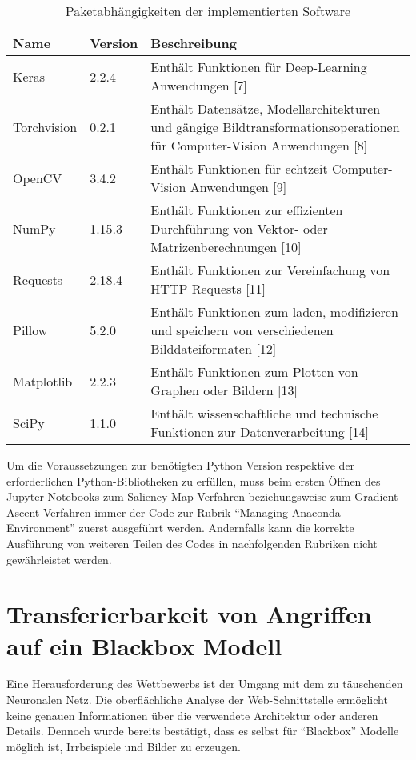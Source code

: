 \begin{table}
	\centering
	\begin{tabular}{|l|l|p{10.4cm}|}
		\hline 
		Name & Version & Beschreibung \\ 
		\hline\hline 
		Keras& 2.2.4  & Enthält Funktionen für Deep-Learning Anwendungen [7] \\ 
		\hline 
		Torchvision& 0.2.1 & Enthält Datensätze, Modellarchitekturen und gängige Bildtransformationsoperationen für Computer-Vision Anwendungen [8] \\ 
		\hline 
		OpenCV& 3.4.2  & Enthält Funktionen für echtzeit Computer-Vision Anwendungen [9] \\ 
		\hline 
		NumPy&  1.15.3& Enthält Funktionen zur effizienten Durchführung von Vektor- oder Matrizenberechnungen [10] \\ 
		\hline 
		Requests& 2.18.4 & Enthält Funktionen zur Vereinfachung von HTTP Requests [11] \\ 
		\hline 
		Pillow& 5.2.0 & Enthält Funktionen zum laden, modifizieren und speichern von verschiedenen Bilddateiformaten [12] \\ 
		\hline 
		Matplotlib& 2.2.3 & Enthält Funktionen zum Plotten von Graphen oder Bildern [13] \\ 
		\hline 
		SciPy& 1.1.0  & Enthält wissenschaftliche und technische Funktionen zur Datenverarbeitung [14] \\ 
		\hline 
	\end{tabular} 
	\caption{Paketabhängigkeiten der implementierten Software}
	\label{tab:parameter}
\end{table}

Um die Voraussetzungen zur benötigten Python Version respektive der erforderlichen Python-Bibliotheken zu erfüllen, muss beim ersten Öffnen des Jupyter Notebooks zum Saliency Map Verfahren beziehungsweise zum Gradient Ascent Verfahren immer der Code zur Rubrik “Managing Anaconda Environment” zuerst ausgeführt werden. Andernfalls kann die korrekte Ausführung von weiteren Teilen des Codes in nachfolgenden Rubriken nicht gewährleistet werden.

\section{Transferierbarkeit von Angriffen auf ein Blackbox Modell}


\label{sec:TrasiModell}
Eine Herausforderung des Wettbewerbs ist der Umgang mit dem zu täuschenden Neuronalen Netz. Die oberflächliche Analyse der Web-Schnittstelle ermöglicht keine genauen Informationen über die verwendete Architektur oder anderen Details. Dennoch wurde bereits bestätigt, dass es selbst für “Blackbox” Modelle möglich ist, Irrbeispiele und Bilder zu erzeugen.

